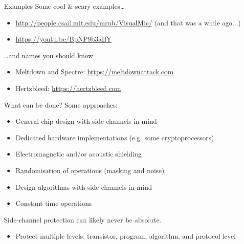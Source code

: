 \begin{frame}{Examples}
  Some cool \& scary examples\dots
  \begin{itemize}[<+(1)->]
    \item {\small\url{http://people.csail.mit.edu/mrub/VisualMic/}} (and that was a while ago...)
    \item {\small\url{https://youtu.be/BpNP9b3aIfY}}
  \end{itemize}

  \vspace*{1em}

  \pause
  \dots{}and names you should know
  \begin{itemize}[<+(1)->]
    \item Meltdown and Spectre: {\small\url{https://meltdownattack.com}}
    \item Hertzbleed: {\small\url{https://hertzbleed.com}}
  \end{itemize}
\end{frame}

\begin{frame}{What can be done?}
  Some approaches:
  \begin{itemize}[<+(1)->]
    \item General chip design with side-channels in mind
    \item Dedicated hardware implementations (e.g. some cryptoprocessors)
    \item Electromagnetic and/or acoustic shielding
    \item Randomisation of operations (masking and noise)
    \item Design algorithms with side-channels in mind
    \item Constant time operations
  \end{itemize}

  \vspace*{1em}

  \pause
  Side-channel protection can likely never be absolute.
  \begin{itemize}[<+(1)->]
    \item Protect multiple levels: transistor, program, algorithm, and protocol level
  \end{itemize}
\end{frame}

